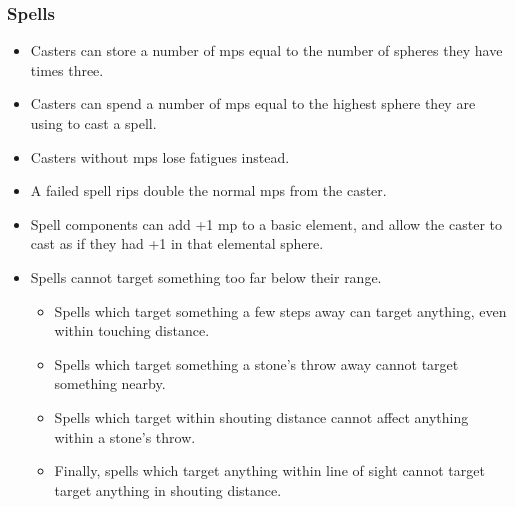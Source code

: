 \subsubsection*{Spells}
\begin{itemize}
  \item
  Casters can store a number of \glspl{mp} equal to the number of spheres they have times three.
  \item
  Casters can spend a number of \glspl{mp} equal to the highest sphere they are using to cast a spell.
  \item
  Casters without \glspl{mp} lose \glspl{fatigue} instead.
  \item
  A failed spell rips double the normal \glspl{mp} from the caster.
  \item
  Spell components can add +1 \gls{mp} to a basic element, and allow the caster to cast as if they had +1 in that elemental sphere.
  \item
  Spells cannot target something too far below their range.
  \begin{itemize}
    \item
    Spells which target something a few steps away can target anything, even within touching distance.
    \item
    Spells which target something a stone's throw away cannot target something nearby.
    \item
    Spells which target within shouting distance cannot affect anything within a stone's throw.
    \item
    Finally, spells which target anything within line of sight cannot target target anything in shouting distance.
  \end{itemize}
\end{itemize}
